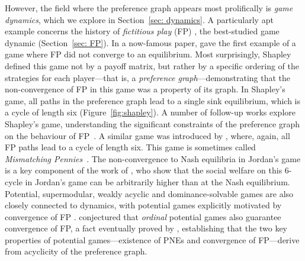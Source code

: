 \documentclass[preprint,authoryear]{elsarticle}
\begin{document}
However, the field where the preference graph appears most prolifically is \emph{game dynamics}, which we explore in Section~\ref{sec: dynamics}. A particularly apt example concerns the history of \emph{fictitious play} (FP) \citep{brown1949some}, the best-studied game dynamic (Section~\ref{sec: FP}). In a now-famous paper, \cite{shapley_topics_1964} gave the first example of a game where FP did not converge to an equilibrium. Most surprisingly, Shapley defined this game not by a payoff matrix, but rather by a specific ordering of the strategies for each player---that is, a \emph{preference graph}---demonstrating that the non-convergence of FP in this game was a property of its graph. In Shapley's game, all paths in the preference graph lead to a single sink equilibrium, which is a cycle of length six (Figure~\ref{fig:shapley}). A number of follow-up works explore Shapley's game, understanding the significant constraints of the preference graph on the behaviour of FP~\citep{monderer_fictitious_1997,berger_browns_2007,berger_two_2007,krishna_convergence_1998}.
A similar game was introduced by \cite{jordan_three_1993}, where, again, all FP paths lead to a cycle of length six. This game is sometimes called \emph{Mismatching Pennies}~\citep{sandholm2010population, kleinberg_beyond_2011}. %
The non-convergence to Nash equilibria in Jordan's game is a key component of the work of \citeauthor{kleinberg_beyond_2011}, who show that the social welfare on this 6-cycle in Jordan's game can be arbitrarily higher than at the Nash equilibrium. Potential, supermodular, weakly acyclic and dominance-solvable games are also closely connected to dynamics, with potential games explicitly motivated by convergence of FP \citep{monderer_potential_1996,monderer_fictitious_1996}. \citeauthor{monderer_fictitious_1996} conjectured that \emph{ordinal} potential games also guarantee convergence of FP, a fact eventually proved by \cite{berger_browns_2007,berger_two_2007}, establishing that the two key properties of potential games---existence of PNEs and convergence of FP---derive from acyclicity of the preference graph.
\end{document}
